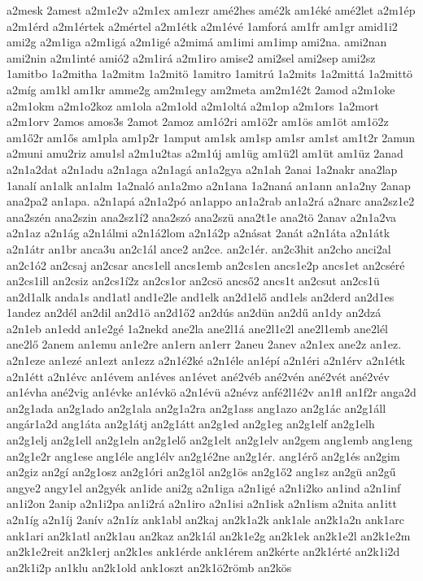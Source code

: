 {a2mesk
2amest
a2m1e2v
a2m1ex
am1ezr
amé2hes
amé2k
am1éké
amé2let
a2m1ép
a2m1érd
a2m1értek
a2mértel
a2m1étk
a2m1évé
1amforá
am1fr
am1gr
amid1i2
ami2g
a2m1iga
a2m1igá
a2m1igé
a2mimá
am1imi
am1imp
ami2na.
ami2nan
ami2nin
a2m1inté
amió2
a2m1irá
a2m1iro
amise2
ami2sel
ami2sep
ami2sz
1amitbo
1a2mitha
1a2mitm
1a2mitö
1amitro
1amitrú
1a2mits
1a2mittá
1a2mittö
a2míg
am1kl
am1kr
amme2g
am2m1egy
am2meta
am2m1é2t
2amod
a2m1oke
a2m1okm
a2m1o2koz
am1ola
a2m1old
a2m1oltá
a2m1op
a2m1ors
1a2mort
a2m1orv
2amos
amos3s
2amot
2amoz
am1ó2ri
am1ö2r
am1ös
am1öt
am1ö2z
am1ő2r
am1ős
am1pla
am1p2r
1amput
am1sk
am1sp
am1sr
am1st
am1t2r
2amun
a2muni
amu2riz
amu1sl
a2m1u2tas
a2m1új
am1üg
am1ü2l
am1üt
am1üz
2anad
a2n1a2dat
a2n1adu
a2n1aga
a2n1agá
an1a2gya
a2n1ah
2anai
1a2nakr
ana2lap
1analí
an1alk
an1alm
1a2naló
an1a2mo
a2n1ana
1a2naná
an1ann
an1a2ny
2anap
ana2pa2
an1apa.
a2n1apá
a2n1a2pó
an1appo
an1a2rab
an1a2rá
a2narc
ana2sz1e2
ana2szén
ana2szin
ana2sz1í2
ana2szó
ana2szü
ana2t1e
ana2tö
2anav
a2n1a2va
a2n1az
a2n1ág
a2n1álmi
a2n1á2lom
a2n1á2p
a2násat
2anát
a2n1áta
a2n1átk
a2n1átr
an1br
anca3u
an2c1ál
ance2
an2ce.
an2c1ér.
an2c3hit
an2cho
anci2al
an2c1ó2
an2csaj
an2csar
ancs1ell
ancs1emb
an2cs1en
ancs1e2p
ancs1et
an2cséré
an2cs1ill
an2csiz
an2cs1í2z
an2cs1or
an2csö
ancső2
ancs1t
an2csut
an2cs1ü
an2d1alk
anda1s
and1atl
and1e2le
and1elk
an2d1elő
and1els
an2derd
an2d1es
1andez
an2dél
an2dil
an2d1ö
an2d1ő2
an2dús
an2dün
an2dű
an1dy
an2dzá
a2n1eb
an1edd
an1e2gé
1a2nekd
ane2la
ane2l1á
ane2l1e2l
ane2l1emb
ane2lél
ane2lő
2anem
an1emu
an1e2re
an1ern
an1err
2aneu
2anev
a2n1ex
ane2z
an1ez.
a2n1eze
an1ezé
an1ezt
an1ezz
a2n1é2ké
a2n1éle
an1épí
a2n1éri
a2n1érv
a2n1étk
a2n1étt
a2n1évc
an1évem
an1éves
an1évet
ané2véb
ané2vén
ané2vét
ané2vév
an1évha
ané2vig
an1évke
an1évkö
a2n1évü
a2névz
anfé2l1é2v
an1fl
an1f2r
anga2d
an2g1ada
an2g1ado
an2g1ala
an2g1a2ra
an2g1ass
ang1azo
an2g1ác
an2g1áll
angár1a2d
ang1áta
an2g1átj
an2g1átt
an2g1ed
an2g1eg
an2g1elf
an2g1elh
an2g1elj
an2g1ell
an2g1eln
an2g1elő
an2g1elt
an2g1elv
an2gem
ang1emb
ang1eng
an2g1e2r
ang1ese
ang1éle
ang1élv
an2g1é2ne
an2g1ér.
ang1érő
an2g1és
an2gim
an2giz
an2gí
an2g1osz
an2g1óri
an2g1öl
an2g1ös
an2g1ő2
ang1sz
an2gü
an2gű
angye2
angy1el
an2gyék
an1ide
ani2g
a2n1iga
a2n1igé
a2n1i2ko
an1ind
a2n1inf
an1i2on
2anip
a2n1i2pa
an1i2rá
a2n1iro
a2n1isi
a2n1isk
a2n1ism
a2nita
an1itt
a2n1íg
a2n1íj
2anív
a2n1íz
ank1abl
an2kaj
an2k1a2k
ank1ale
an2k1a2n
ank1arc
ank1ari
an2k1atl
an2k1au
an2kaz
an2k1ál
an2k1e2g
an2k1ek
an2k1e2l
an2k1e2m
an2k1e2reit
an2k1erj
an2k1es
ank1érde
ank1érem
an2kérte
an2k1érté
an2k1i2d
an2k1i2p
an1klu
an2k1old
ank1oszt
an2k1ö2römb
an2kös
}
